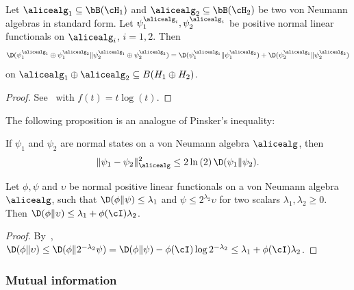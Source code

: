 \begin{proposition}\label{prop:direct_sum_entropy}
	Let $\alicealg_1 \subseteq \bB(\cH_1)$ and $\alicealg_2\subseteq \bB(\cH_2)$ be two von Neumann algebras in standard form. Let $\psi_1^{\alicealg_i}, \psi_2^{\alicealg_i}$ be  positive normal linear functionals on $\alicealg_i$, $i=1,2$. Then
	\begin{equation*}
		\D(\psi_1^{\alicealg_1} \oplus \psi_1^{\alicealg_2} \| \psi_2^{\alicealg_1} \oplus \psi_2^{\alicealg_2}) =  \D(\psi_1^{\alicealg_1} \| \psi_1^{\alicealg_2} ) + \D(\psi_2^{\alicealg_1} \| \psi_2^{\alicealg_2})
	\end{equation*}
	on $\alicealg_1 \oplus \alicealg_2 \subseteq B(H_1 \oplus H_2)$. 
\end{proposition}
\begin{proof}
	See~\cite[Proposition 2.3]{hiaiQuantumFDivergencesNeumann2021a}  with $f(t) = t \log(t)$.
\end{proof}
The following proposition is an analogue of Pinsker's inequality:
\begin{proposition} \label{prop:pinsker} 
	If $\psi_1$ and $\psi_2$ are normal states on a von Neumann algebra $\alicealg$, then
	\begin{equation*}
		\|\psi_1 - \psi_2\|_{\alicealg}^2 \leq 2 \ln{(2)} \, \D(\psi_1 \| \psi_2).
	\end{equation*}
\end{proposition}

\begin{proposition}
	\label{prop:relative_min_entropy_chain_rule2}
	Let $\phi, \psi$ and $\upsilon$ be normal positive linear functionals on a von Neumann algebra $\alicealg$, such that $\D(\phi \| \psi) \leq \lambda_1$ and $\psi \leq 2^{\lambda_2} \upsilon$ for two scalars $\lambda_1, \lambda_2 \geq 0$. Then $\D(\phi \| \upsilon) \leq \lambda_1 + \phi(\cI) \lambda_2$.
\end{proposition}
\begin{proof} 
	By~, $\D(\phi \| \upsilon) \leq \D(\phi \| 2^{-\lambda_2} \psi) = \D(\phi \| \psi) - \phi(\cI)\log{2^{- \lambda_2}} \leq \lambda_1 + \phi(\cI) \lambda_2$.
\end{proof}


\subsubsection{Mutual information}

